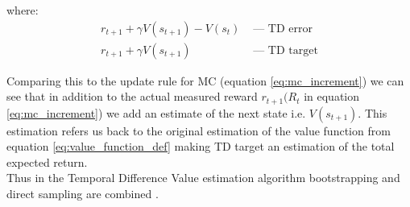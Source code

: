 where:
\begin{align*}
  r_{t+1} + \gamma V(s_{t+1}) - V(s_t) &\text{ — } \text{TD error}\\
  r_{t+1} + \gamma V(s_{t+1}) &\text { — } \text{TD target}
\end{align*}

Comparing this to the update rule for MC (equation \ref{eq:mc_increment}) we can see that in addition to the actual measured reward $r_{t+1} (R_{t}$ in equation \ref{eq:mc_increment}) we add an estimate of the next state i.e. $V(s_{t+1})$. This estimation refers us back to the original estimation of the value function from equation \ref{eq:value_function_def} making TD target an estimation of the total expected return.\\

Thus in the Temporal Difference Value estimation algorithm
bootstrapping and direct sampling are combined \cite{lecture_mfl}. 




